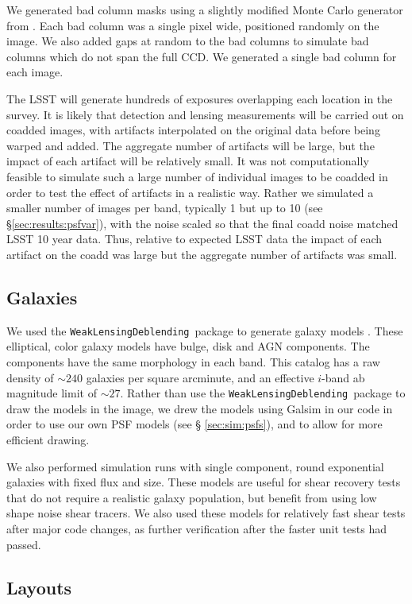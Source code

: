 \documentclass[twocolumn,twocolappendix,astrosym]{openjournal}
\newcommand{\descwl}{\texttt{WeakLensingDeblending}}
\begin{document}
We generated bad column masks using a slightly modified Monte Carlo generator
from \citet{BeckerMdetCoadd}. Each bad column was a single pixel wide,
positioned randomly on the image. We also added gaps at random to the bad
columns to simulate bad columns which do not span the full CCD.  We generated
a single bad column for each image.

The LSST will generate hundreds of exposures overlapping each location in the
survey.  It is likely that detection and lensing measurements will be carried
out on coadded images, with artifacts interpolated on the original data before
being warped and added.  The aggregate number of artifacts will be large, but
the impact of each artifact will be relatively small.  It was not
computationally feasible to simulate such a large number of individual images
to be coadded in order to test the effect of artifacts in a realistic way.
Rather we simulated a smaller number of images per band, typically 1 but up to
10 (see \S \ref{sec:results:psfvar}), with the noise scaled so that the final
coadd noise matched LSST 10 year data.  Thus, relative to expected LSST data
the impact of each artifact on the coadd was large but the aggregate number of
artifacts was small.

\subsection{Galaxies} \label{sec:sim:galaxies}

We used the \descwl\ package to generate galaxy models
\citep{DESCWLSanchez2021}.  These elliptical, color galaxy models have bulge,
disk and AGN components.  The components have the same morphology in each band.
This catalog has a raw density of $\sim240$ galaxies per square arcminute, and
an effective $i$-band ab magnitude limit of $\sim27$.  Rather than use the
\descwl\ package to draw the models in the image, we drew the models using
Galsim in our code in order to use our own PSF models (see \S
\ref{sec:sim:psfs}), and to allow for more efficient drawing.

We also performed simulation runs with single component, round exponential
galaxies with fixed flux and size.  These models are useful for shear recovery
tests that do not require a realistic galaxy population, but benefit from using
low shape noise shear tracers.  We also used these models for relatively fast
shear tests after major code changes, as further verification after the faster
unit tests had passed.

\subsection{Layouts} \label{sec:sim:layouts}
\end{document}
